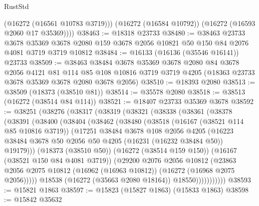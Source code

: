\begin{lexlean}{RustStd}
\begin{coremodule}
          (@16272 (@16561 @10783 @3719)))
        (@16272 (@16584 @10792))
        (@16272 (@16593 @2060 @17 @35369))))
@38463 := @18318 @23733
@38480 := @38463
    @23733
    @3678
    @35369
    @3678
    @2080
    @159
    @3678
    @2056
    @10821
    @50
    @150
    @84
    @2076
    @4081
    @3719
    @3719
    @10812
@38484 := @16133 (@16136 (@35546 @16141)) @23733
@38509 := @38463
    @38484
    @3678
    @35369
    @3678
    @2080
    @84
    @3678
    @2056
    @4121
    @81
    @114
    @85
    @108
    @10816
    @3719
    @3719
    @4205
    (@18363 @23733 @3678 @35369 @3678 @2080 @3678 @2056)
@38510 := @18393 @2080
@38513 := @38509 (@18373 (@38510 @81))
@38514 := @35578 @2080
@38518 := @38513 (@16272 (@38514 @84 @114))
@38521 := @18407 @23733 @35369 @3678
@38592 := @38251
    (@38276
      (@38317
        (@38319
          (@38321
            (@38338
              (@38361
                (@38378
                  (@38391
                    (@38400
                      (@38404
                        (@38462
                          (@38480
                            (@38518
                              (@16167 (@38521 @114 @85 @10816 @3719))
                              (@17251
                                @38484
                                @3678
                                @108
                                @2056
                                @4205
                                (@16223
                                  @38484
                                  @3678
                                  @50
                                  @2056
                                  @50
                                  @4205
                                  (@16231 (@16232 @38484 @50))
                                  @19179)))
                            (@18373 (@38510 @50))
                            (@16272 (@38514 @159 @150))
                            (@16167 (@38521 @150 @84 @4081 @3719))
                            (@29200
                              @2076
                              @2056
                              @10812
                              (@23863
                                @2056
                                @2075
                                @10812
                                (@16962 (@16963 @10812))
                                (@16272 (@16968 @2075 @2056)))))
                          @18538
                          (@16272 (@35663 @2080 @18164))
                          @18550)))))))))))
@38593 := @15821 @1863
@38597 := @15823 (@15827 @1863) (@15833 @1863)
@38598 := @15842 @35632

\end{coremodule}
\end{lexlean}
